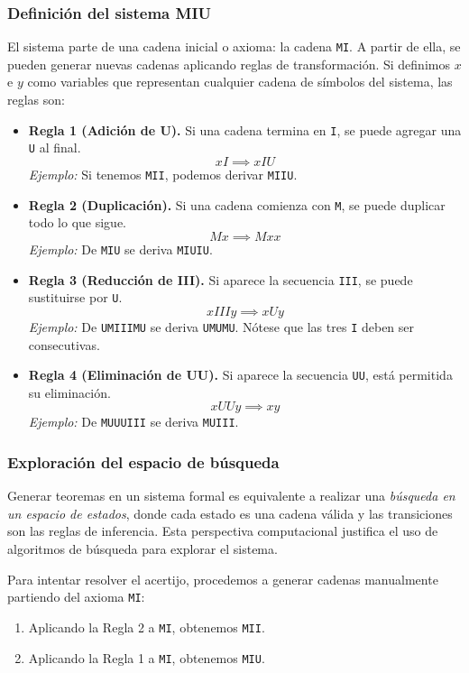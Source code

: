 \subsubsection{Definición del sistema MIU}

El sistema parte de una cadena inicial o axioma: la cadena \texttt{MI}. A partir de ella, se pueden generar nuevas
cadenas aplicando reglas de transformación. Si definimos $x$ e $y$ como variables que representan cualquier cadena de
símbolos del sistema, las reglas son:

\begin{itemize}
    \item \textbf{Regla 1 (Adición de U).} Si una cadena termina en \texttt{I}, se puede agregar una \texttt{U} al final.
          \[ xI \implies xIU \]
          \emph{Ejemplo:} Si tenemos \texttt{MII}, podemos derivar \texttt{MIIU}.

    \item \textbf{Regla 2 (Duplicación).} Si una cadena comienza con \texttt{M}, se puede duplicar todo lo que sigue.
          \[ Mx \implies Mxx \]
          \emph{Ejemplo:} De \texttt{MIU} se deriva \texttt{MIUIU}.

    \item \textbf{Regla 3 (Reducción de III).} Si aparece la secuencia \texttt{III}, se puede sustituirse por \texttt{U}.
          \[ xIIIy \implies xUy \]
          \emph{Ejemplo:} De \texttt{UMIIIMU} se deriva \texttt{UMUMU}. Nótese que las tres \texttt{I} deben ser consecutivas.

    \item \textbf{Regla 4 (Eliminación de UU).} Si aparece la secuencia \texttt{UU}, está permitida su eliminación.
          \[ xUUy \implies xy \]
          \emph{Ejemplo:} De \texttt{MUUUIII} se deriva \texttt{MUIII}.
\end{itemize}

\subsubsection{Exploración del espacio de búsqueda}

Generar teoremas en un sistema formal es equivalente a realizar una \emph{búsqueda en un espacio de estados}, donde
cada estado es una cadena válida y las transiciones son las reglas de inferencia. Esta perspectiva computacional
justifica el uso de algoritmos de búsqueda para explorar el sistema.

Para intentar resolver el acertijo, procedemos a generar cadenas manualmente partiendo del axioma \texttt{MI}:
\begin{enumerate}
    \item Aplicando la Regla 2 a \texttt{MI}, obtenemos \texttt{MII}.
    \item Aplicando la Regla 1 a \texttt{MI}, obtenemos \texttt{MIU}.
\end{enumerate}

